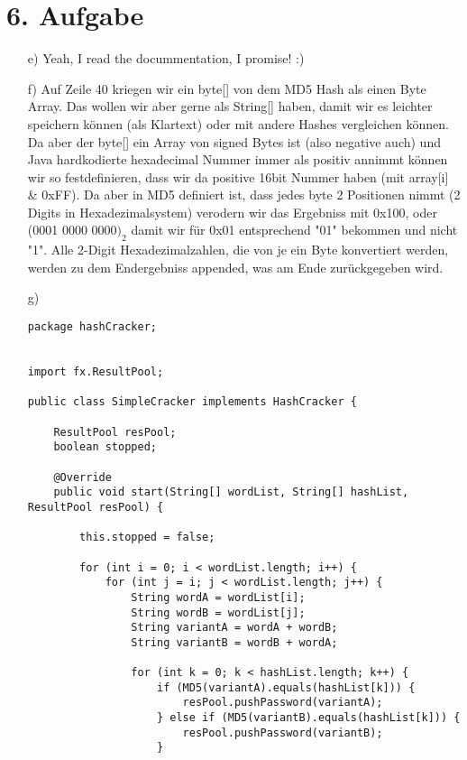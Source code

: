 \section*{6. Aufgabe}

\begin{enumerate}

\item[e)]
Yeah, I read the docummentation, I promise! :)

\item[f)]
Auf Zeile 40 kriegen wir ein byte[] von dem MD5 Hash als einen Byte Array. Das wollen wir aber gerne als String[] haben, damit wir es leichter speichern können (als Klartext) oder mit andere Hashes vergleichen können. Da aber der byte[] ein Array von signed Bytes ist (also negative auch) und Java hardkodierte hexadecimal Nummer immer als positiv annimmt können wir so festdefinieren, dass wir da positive 16bit Nummer haben (mit array[i] \& 0xFF). Da aber in MD5 definiert ist, dass jedes byte 2 Positionen nimmt (2 Digits in Hexadezimalsystem) verodern wir das Ergebniss mit 0x100, oder (0001 0000 0000$)_2$ damit wir für 0x01 entsprechend "01" bekommen und nicht "1". Alle 2-Digit Hexadezimalzahlen, die von je ein Byte konvertiert werden, werden zu dem Endergebniss appended, was am Ende zurückgegeben wird.

\item[g)]

\begin{lstlisting}[style=java]
package hashCracker;


import fx.ResultPool;

public class SimpleCracker implements HashCracker {

    ResultPool resPool;
    boolean stopped;

    @Override
    public void start(String[] wordList, String[] hashList, ResultPool resPool) {

        this.stopped = false;

        for (int i = 0; i < wordList.length; i++) {
            for (int j = i; j < wordList.length; j++) {
                String wordA = wordList[i];
                String wordB = wordList[j];
                String variantA = wordA + wordB;
                String variantB = wordB + wordA;

                for (int k = 0; k < hashList.length; k++) {
                    if (MD5(variantA).equals(hashList[k])) {
                        resPool.pushPassword(variantA);
                    } else if (MD5(variantB).equals(hashList[k])) {
                        resPool.pushPassword(variantB);
                    }


\end{lstlisting}
\end{enumerate}
